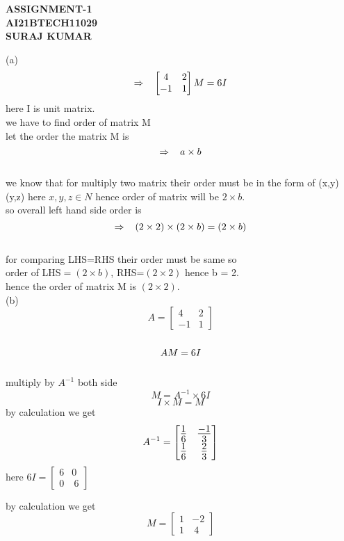 \documentclass[12pt]{book}
\begin{document}
\huge \centering \textbf{ASSIGNMENT-1}\\
\Large \centering \textbf{AI21BTECH11029}\\
\Large \centering \textbf{SURAJ KUMAR}\\
\begin{multicols}{2}
\begin{flushleft}
(a) $$\Rightarrow \hspace{3mm} \begin{bmatrix}
     4 & 2 \\
     -1 & 1 
      \end{bmatrix}M=6I$$  
    here I is unit matrix.\\
    we have to find order of matrix M\\
    let the order the matrix M is  $$ \Rightarrow \hspace{3mm} a\times b$$\\
      
      we know that for multiply two matrix their order must be in the form of  (x,y) (y,z)  here $x,y,z \in N$
      hence order of matrix will be $2\times b$.\\
      so overall left hand side order is  $$\Rightarrow \hspace{3mm} (2\times 2)\times(2\times b) =(2\times b)$$\\
      for comparing LHS=RHS their order must be same so \\
      order of LHS$=(2\times b)$,
      RHS=$(2\times 2)$  hence b = 2.\\
      hence the order of matrix M is $(2\times 2).$\\

(b)
$$A=\begin{bmatrix}
      4 & 2\\
    -1 & 1
     \end{bmatrix}$$\\
$$\Large AM=6I$$\\
 multiply by $A^{-1}$ both side
 $$M=A^{-1}\times 6I$$  $$ I\times M=M$$
 by calculation we get   $$\Large A^{-1}=\begin{bmatrix}
      \frac{1}{6} & \frac{-1}{3}\\
    \frac{1}{6} & \frac{2}{3}
     \end{bmatrix}$$
\centering here $6I=\begin{bmatrix}
       6&0 \\
    0 & \ 6
     \end{bmatrix}$\\\vspace{5mm}
\raggedright by calculation we get $$M=\begin{bmatrix}
       1&-2 \\
    1 & \ 4
     \end{bmatrix}$$\\
\end{flushleft}
\end{multicols}
\end{document}
